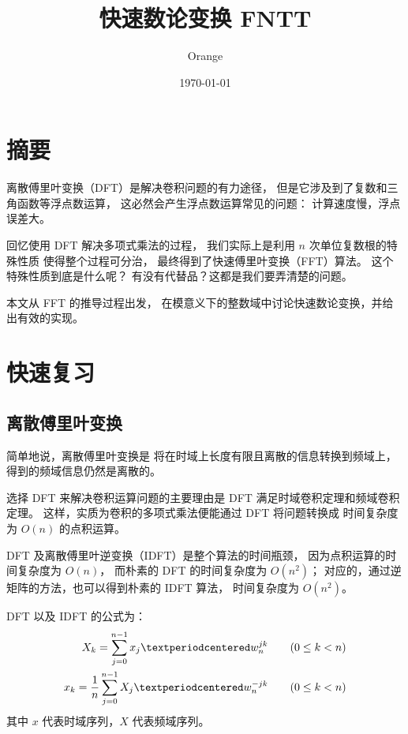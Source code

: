 \documentclass[12pt, UTF8]{article}
\title{快速数论变换 FNTT}
\author{Orange}
\date{\today}
\begin{document}
    \heiti
    \maketitle

    \section{摘要}
    离散傅里叶变换（DFT）是解决卷积问题的有力途径，
    但是它涉及到了复数和三角函数等浮点数运算，
    这必然会产生浮点数运算常见的问题：
    计算速度慢，浮点误差大。

    回忆使用 DFT 解决多项式乘法的过程，
    我们实际上是利用 $n$ 次单位复数根的特殊性质
    使得整个过程可分治，
    最终得到了快速傅里叶变换（FFT）算法。
    这个特殊性质到底是什么呢？
    有没有代替品？这都是我们要弄清楚的问题。

    本文从 FFT 的推导过程出发，
    在模意义下的整数域中讨论快速数论变换，并给出有效的实现。
    
    \bigskip

    \section{快速复习}
    \subsection{离散傅里叶变换}
    简单地说，离散傅里叶变换是
    将在时域上长度有限且离散的信息转换到频域上，
    得到的频域信息仍然是离散的。

    选择 DFT 来解决卷积运算问题的主要理由是
    DFT 满足时域卷积定理和频域卷积定理。
    这样，实质为卷积的多项式乘法便能通过 DFT 将问题转换成
    时间复杂度为 $O(n)$ 的点积运算。

    DFT 及离散傅里叶逆变换（IDFT）是整个算法的时间瓶颈，
    因为点积运算的时间复杂度为 $O(n)$，
    而朴素的 DFT 的时间复杂度为 $O(n^2)$；
    对应的，通过逆矩阵的方法，也可以得到朴素的 IDFT 算法，
    时间复杂度为 $O(n^2)$。

    \bigskip
    DFT 以及 IDFT 的公式为：
    \begin{align}
        X_k = \sum_{j = 0}^{n - 1} x_j · w_n^{jk} &
        \qquad (0 \le k < n) \notag
        \\
        x_k = \frac {1} {n} \sum_{j = 0}^{n - 1}X_j · w_n^{-jk} &
        \qquad (0 \le k < n) \notag
    \end{align}
    其中 $x$ 代表时域序列，$X$ 代表频域序列。
    
\end{document}
